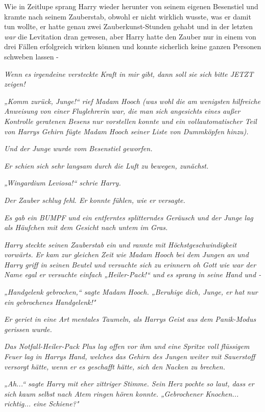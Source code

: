 {Wie in Zeitlupe sprang Harry wieder herunter von seinem eigenen Besenstiel und kramte nach seinem Zauberstab, obwohl er nicht wirklich wusste, was er damit tun wollte, er hatte genau zwei Zauberkunst-Stunden gehabt und in der letzten \emph{war} die Levitation dran gewesen, aber Harry hatte den Zauber nur in einem von drei Fällen erfolgreich wirken können und konnte sicherlich keine ganzen Personen schweben lassen -

\emph{Wenn es irgendeine versteckte Kraft in mir gibt, dann soll sie sich bitte JETZT zeigen!}

\emph{„Komm zurück, Junge!“ rief Madam Hooch (was wohl die am wenigsten hilfreiche Anweisung von einer} \emph{\emph{Fluglehrerin}} \emph{war, die man sich angesichts eines außer Kontrolle geratenen Besens nur vorstellen konnte und ein vollautomatischer Teil von Harrys Gehirn fügte Madam Hooch seiner Liste von Dummköpfen hinzu).}

\emph{Und der Junge wurde vom Besenstiel geworfen.}

\emph{Er schien sich sehr langsam durch die Luft zu bewegen, zunächst.}

\emph{„\emph{Wingardium Leviosa!}“ schrie Harry.}

\emph{Der Zauber schlug fehl. Er konnte fühlen, wie er versagte.}

\emph{Es gab ein BUMPF und ein entferntes splitterndes Geräusch und der Junge lag als Häufchen mit dem Gesicht nach untem im Gras.}

\emph{Harry steckte seinen Zauberstab ein und rannte mit Höchstgeschwindigkeit vorwärts. Er kam zur gleichen Zeit wie Madam Hooch bei dem Jungen an und Harry griff in seinen Beutel und versuchte sich zu erinnern oh Gott wie war der Name egal er versuchte einfach „Heiler-Pack!“ und es sprang in seine Hand und -}

\emph{„Handgelenk gebrochen,“ sagte Madam Hooch. „Beruhige dich, Junge, er hat nur ein gebrochenes Handgelenk!"}

\emph{Er geriet in eine Art mentales Taumeln, als Harrys Geist aus dem Panik-Modus gerissen wurde.}

\emph{Das Notfall-Heiler-Pack Plus lag offen vor ihm und eine Spritze voll flüssigem Feuer lag in Harrys Hand, welches das Gehirn des Jungen weiter mit Sauerstoff versorgt hätte, wenn er es geschafft hätte, sich den Nacken zu brechen.}

\emph{„Ah...“ sagte Harry mit eher zittriger Stimme. Sein Herz pochte so laut, dass er sich kaum selbst nach Atem ringen hören konnte. „Gebrochener Knochen... richtig... eine Schiene?"}

}
